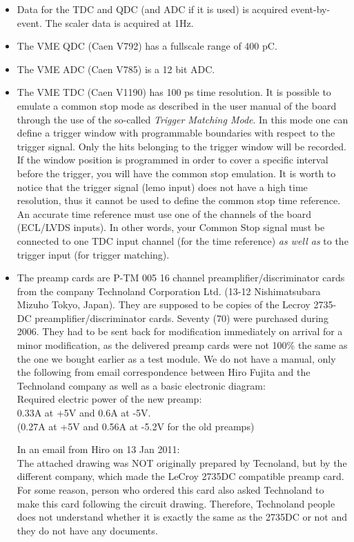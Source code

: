 \documentclass[11pt]{report}
\begin{document}
\begin{itemize}
\item Data for the TDC and QDC (and ADC if it is used) is acquired event-by-event. 
The scaler data is acquired at 1Hz.
\item The VME QDC (Caen V792) has a fullscale range of 400 pC.
\item The VME ADC (Caen V785) is a 12 bit ADC.
\item The VME TDC (Caen V1190) has 100 ps time resolution.
It is possible to emulate a common stop mode as described in the user manual of the board
through the use of the so-called {\it Trigger Matching Mode}. In this mode one can define a trigger window 
with programmable boundaries with respect to the trigger signal. Only the hits belonging to the 
trigger window will be recorded. If the window position is programmed in order to cover a 
specific interval before the trigger, you will have the common stop emulation. It is worth 
to notice that the trigger signal (lemo input) does not have a high time resolution, 
thus it cannot be used to define the common stop time reference.
An accurate time reference must use one of the channels of the board (ECL/LVDS inputs). 
In other words, your Common Stop signal must be connected to one TDC input channel 
(for the time reference) {\it as well as} to the trigger input (for trigger matching).

\item The preamp cards are P-TM 005 16 channel preamplifier/discriminator cards
from the company Technoland Corporation Ltd. (13-12 Nishimatsubara Mizuho Tokyo, Japan).
They are supposed to be copies of the Lecroy 2735-DC preamplifier/discriminator cards.
Seventy (70) were purchased during 2006. They had to be sent back for modification
immediately on arrival for a minor modification, as the delivered preamp cards were
not 100\% the same as the one we bought earlier as a test module.
We do not have a manual, only the following from email correspondence between Hiro Fujita and
the Technoland company as well as a basic electronic diagram:\\
Required electric power of the new preamp:\\
0.33A at +5V and 0.6A at -5V.\\
(0.27A at +5V and 0.56A at -5.2V for the old preamps)

In an email from Hiro on 13 Jan 2011:\\
The attached drawing was NOT originally prepared by Tecnoland, but by
the different company, which made the LeCroy 2735DC compatible preamp
card. For some reason, person who ordered this card also asked
Technoland to make this card following the circuit drawing. Therefore,
Technoland people does not understand whether it is exactly the same as
the 2735DC or not and they do not have any documents.


\end{itemize}
\end{document}
